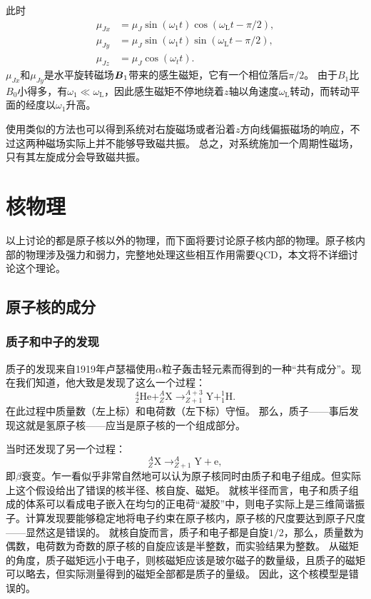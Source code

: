 \documentclass[UTF8, a4paper]{ctexart}
\newcommand*{\nuclear}[3]{^{#2}_{#3}\text{#1}}
\begin{document}
此时
\begin{equation}
    \begin{aligned}
        \mu_{Jx} &= \mu_J \sin(\omega_1 t) \cos(\omega_\text{L} t - \pi / 2), \\
        \mu_{Jy} &= \mu_J \sin(\omega_1 t) \sin(\omega_\text{L} t - \pi / 2), \\
        \mu_{Jz} &= \mu_J \cos(\omega_t t).
    \end{aligned}
\end{equation}
$\mu_{Jx}$和$\mu_{Jy}$是水平旋转磁场$\vb*{B}_1$带来的感生磁矩，它有一个相位落后$\pi / 2$。
由于$B_1$比$B_0$小得多，有$\omega_1 \ll \omega_\text{L}$，因此感生磁矩不停地绕着$z$轴以角速度$\omega_\text{L}$转动，而转动平面的经度以$\omega_1$升高。

使用类似的方法也可以得到系统对右旋磁场或者沿着$z$方向线偏振磁场的响应，不过这两种磁场实际上并不能够导致磁共振。
总之，对系统施加一个周期性磁场，只有其左旋成分会导致磁共振。

\section{核物理}

以上讨论的都是原子核以外的物理，而下面将要讨论原子核内部的物理。原子核内部的物理涉及强力和弱力，完整地处理这些相互作用需要QCD，本文将不详细讨论这个理论。

\subsection{原子核的成分}

\subsubsection{质子和中子的发现}

质子的发现来自1919年卢瑟福使用$\alpha$粒子轰击轻元素而得到的一种“共有成分”。现在我们知道，他大致是发现了这么一个过程：
\[
    \nuclear{He}{4}{2} + \nuclear{X}{A}{Z} \longrightarrow \nuclear{Y}{A+3}{Z+1} + \nuclear{H}{1}{1}.
\]
在此过程中质量数（左上标）和电荷数（左下标）守恒。
那么，质子——事后发现这就是氢原子核——应当是原子核的一个组成部分。

当时还发现了另一个过程：
\[
    \nuclear{X}{A}{Z} \longrightarrow \nuclear{Y}{A}{Z+1} + \text{e},
\]
即$\beta$衰变。乍一看似乎非常自然地可以认为原子核同时由质子和电子组成。但实际上这个假设给出了错误的核半径、核自旋、磁矩。
就核半径而言，电子和质子组成的体系可以看成电子嵌入在均匀的正电荷“凝胶”中，则电子实际上是三维简谐振子。计算发现要能够稳定地将电子约束在原子核内，原子核的尺度要达到原子尺度——显然这是错误的。
就核自旋而言，质子和电子都是自旋$1/2$，那么，质量数为偶数，电荷数为奇数的原子核的自旋应该是半整数，而实验结果为整数。
从磁矩的角度，质子磁矩远小于电子，则核磁矩应该是玻尔磁子的数量级，且质子的磁矩可以略去，但实际测量得到的磁矩全部都是质子的量级。
因此，这个核模型是错误的。
\end{document}
